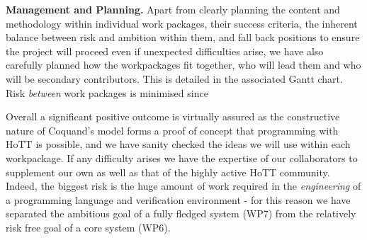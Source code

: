 \documentclass[a4paper,11pt]{article}
\begin{document}
{\bf Management and Planning.} Apart from clearly planning the content
and methodology within individual work packages, their success
criteria, the inherent balance between risk and ambition within them,
and fall back positions to ensure the project will proceed even if
unexpected difficulties arise, we have also carefully planned how the
workpackages fit together, who will lead them and who will be secondary
contributors. This is detailed in the associated Gantt chart.
Risk {\em between} work packages is minimised since

Overall a significant positive outcome is virtually assured as the
constructive nature of Coquand's model forms a proof of concept that
programming with HoTT is possible, and we have sanity checked the
ideas we will use within each workpackage. If any difficulty arises we
have the expertise of our collaborators to supplement our own as well
as that of the highly active HoTT community. Indeed, the biggest risk
is the huge amount of work required in the {\em engineering} of a
programming language and verification environment - for this reason we
have separated the ambitious goal of a fully fledged system (WP7) from
the relatively risk free goal of a core system (WP6).
\end{document}
